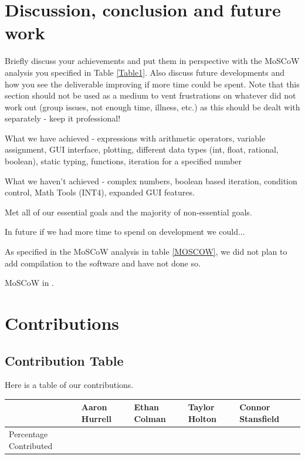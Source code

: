 \documentclass[a4paper, oneside, 11pt]{report}
\begin{document}
    \chapter{Discussion, conclusion and future work}

    Briefly discuss your achievements and put them in perspective with the MoSCoW analysis you specified in Table \ref{Table1}. 
	Also discuss future developments and how you see the deliverable improving if more time could be spent. 
	Note that this section should not be used as a medium to vent frustrations on whatever did not work out (group issues, not enough time, illness, etc.) as this should be dealt with separately - keep it professional!

	What we have achieved - expressions with arithmetic operators, variable assignment, GUI interface, plotting, different data types (int, float, rational, boolean), static typing, functions, iteration for a specified number

	What we haven't achieved - complex numbers, boolean based iteration, condition control, Math Tools (INT4), expanded GUI features.

	Met all of our essential goals and the majority of non-essential goals.

	In future if we had more time to spend on development we could...

	As specified in the MoSCoW analysis in table \ref{MOSCOW}, we did not plan to add compilation to the software and have not done so.

	MoSCoW in .

    
    


    \appendix
    \chapter{Contributions}
    \section{Contribution Table}
    Here is a table of our contributions. \\

    \begin{table}[h]
        \begin{tabular}{|l|l|l|l|l|}
            \hline
            & Aaron Hurrell & Ethan Colman & Taylor Holton & Connor Stansfield \\ \hline
            Percentage Contributed &               &              &               &                  \\ \hline
        \end{tabular}
    \end{table}
\end{document}
